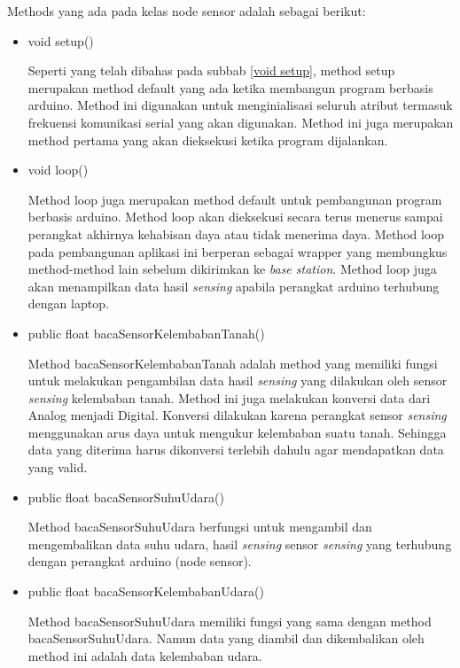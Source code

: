     Methods yang ada pada kelas node sensor adalah sebagai berikut:
    
    \begin{itemize}
        \item void setup()
        
        Seperti yang telah dibahas pada subbab \ref{void setup}, method setup merupakan method default yang ada ketika membangun program berbasis arduino. Method ini digunakan untuk menginialisasi seluruh atribut termasuk frekuensi komunikasi serial yang akan digunakan. Method ini juga merupakan method pertama yang akan dieksekusi ketika program dijalankan.
        
        \item void loop()
        
        Method loop juga merupakan method default untuk pembangunan program berbasis arduino. Method loop akan dieksekusi secara terus menerus sampai perangkat akhirnya kehabisan daya atau tidak menerima daya. Method loop pada pembangunan aplikasi ini berperan sebagai wrapper yang membungkus method-method lain sebelum dikirimkan ke \textit{base station}. Method loop juga akan menampilkan data hasil \textit{sensing} apabila perangkat arduino terhubung dengan laptop. 
        
        \item public float bacaSensorKelembabanTanah()
        
        Method bacaSensorKelembabanTanah adalah method yang memiliki fungsi untuk melakukan pengambilan data hasil \textit{sensing} yang dilakukan oleh sensor \textit{sensing} kelembaban tanah. Method ini juga melakukan konversi data dari Analog menjadi Digital. Konversi dilakukan karena perangkat sensor \textit{sensing} menggunakan arus daya untuk mengukur kelembaban suatu tanah. Sehingga data yang diterima harus dikonversi terlebih dahulu agar mendapatkan data yang valid.
        
        \item public float bacaSensorSuhuUdara()
        
        Method bacaSensorSuhuUdara berfungsi untuk mengambil dan mengembalikan data suhu udara, hasil \textit{sensing} sensor \textit{sensing} yang terhubung dengan perangkat arduino (node sensor).
        
        \item public float bacaSensorKelembabanUdara()
        
        Method bacaSensorSuhuUdara memiliki fungsi yang sama dengan method bacaSensorSuhuUdara. Namun data yang diambil dan dikembalikan oleh method ini adalah data kelembaban udara.
        

\end{itemize}
